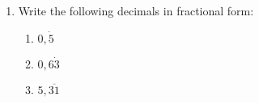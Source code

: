 \begin{exercises}{}
{\begin{enumerate}[itemsep=5pt, label=\textbf{\arabic*}. ]
    \begin{enumerate}[itemsep=5pt, label=\textbf{(\alph*)} ] 
    \item $\dfrac{2}{3}$
    \item $1\dfrac{3}{11}$
    \item $4\dfrac{5}{6}$
    \item $2\dfrac{1}{9}$
    \end{enumerate}
\item Write the following decimals in fractional form:
    \begin{enumerate}[itemsep=5pt, label=\textbf{(\alph*)} ] 
    \item $0,\dot{5}$
    \item $0,6\dot{3}$
    \item $5,\overline{31}$
    \end{enumerate}
\end{enumerate}
}
\end{exercises}


